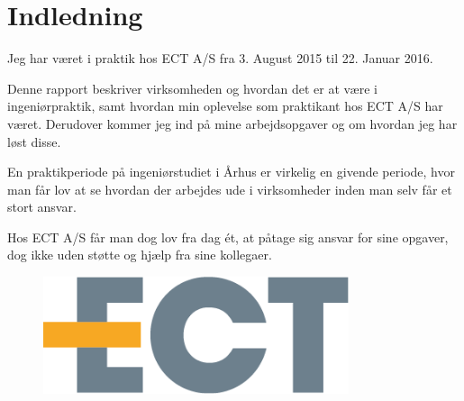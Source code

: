 \chapter{Indledning}

Jeg har været i praktik hos ECT A/S fra 3. August 2015 til 22. Januar 2016. 

Denne rapport beskriver virksomheden og hvordan det er at være i ingeniørpraktik, samt hvordan min oplevelse som praktikant hos ECT A/S har været. Derudover kommer jeg ind på mine arbejdsopgaver og om hvordan jeg har løst disse.

En praktikperiode på ingeniørstudiet i Århus er virkelig en givende periode, hvor man får lov at se hvordan der arbejdes ude i virksomheder inden man selv får et stort ansvar. 

Hos ECT A/S får man dog lov fra dag ét, at påtage sig ansvar for sine opgaver, dog ikke uden støtte og hjælp fra sine kollegaer.

\hfill\break
\hfill\break
\hfill\break
\hfill\break
\hfill\break
\hfill\break
\hfill\break

\begin{figure}[H] \centering
	\includegraphics[width=0.8\textwidth]{billeder/logo}
\end{figure} 